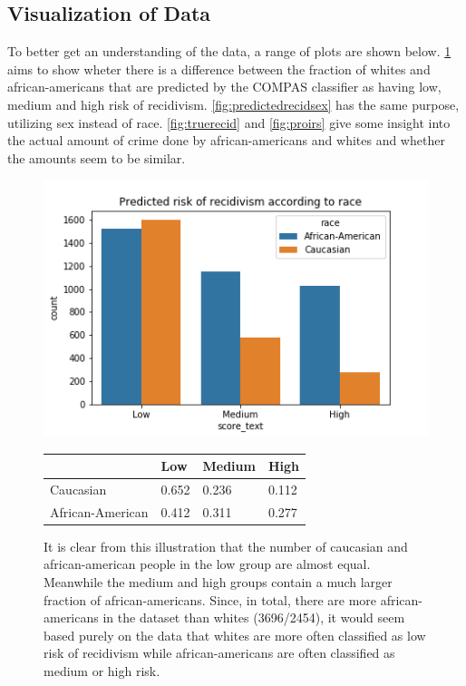 \documentclass[11pt, fleqn, titlepage]{article}
\begin{document}
	\subsection{Visualization of Data} \label{dataVisuals}
	To better get an understanding of the data, a range of plots are shown below. \ref{fig:predictedrecidrace} aims to show wheter there is a difference between the fraction of whites and african-americans that are predicted by the COMPAS classifier as having low, medium and high risk of recidivism. \ref{fig:predictedrecidsex} has the same purpose, utilizing sex instead of race. \ref{fig:truerecid} and \ref{fig:proirs} give some insight into the actual amount of crime done by african-americans and whites and whether the amounts seem to be similar.
	
	\begin{figure}[H]
		\centering
		\includegraphics[width=0.5\linewidth]{imgs/predicted_recid_race}	
		\begin{table}[H]
			\centering
			\begin{tabular}{|l|l|l|l|}
				\hline
				& Low   & Medium & High  \\ \hline
				Caucasian        & 0.652 & 0.236  & 0.112 \\ \hline
				African-American & 0.412 & 0.311  & 0.277 \\ \hline
			\end{tabular}
		\end{table}
		\caption{It is clear from this illustration that the number of caucasian and african-american people in the low group are almost equal. Meanwhile the medium and high groups contain a much larger fraction of african-americans. Since, in total, there are more african-americans in the dataset than whites (3696/2454), it would seem based purely on the data that whites are more often classified as low risk of recidivism while african-americans are often classified as medium or high risk.}
		\label{fig:predictedrecidrace}
	\end{figure}
\end{document}
